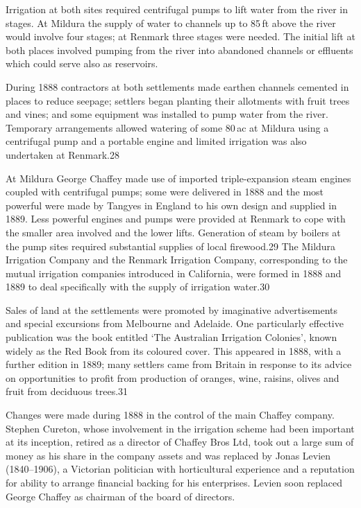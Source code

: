 Irrigation at both sites required centrifugal pumps to lift water from
the river in stages.  At Mildura the supply of water to channels up to
85\,ft above the river would involve four stages; at Renmark three
stages were needed. The initial lift at both places involved pumping
from the river into abandoned channels or effluents which could serve
also as reservoirs.

During 1888 contractors at both settlements made earthen channels
cemented in places to reduce seepage; settlers began planting their
allotments with fruit trees and vines; and some equipment was
installed to pump water from the river. Temporary arrangements allowed
watering of some 80\,ac at Mildura using a centrifugal pump and a
portable engine and limited irrigation was also undertaken at
Renmark.28

At Mildura George Chaffey made use of imported triple-expansion steam
engines coupled with centrifugal pumps; some were delivered in 1888
and the most powerful were made by Tangyes in England to his own
design and supplied in 1889.  Less powerful engines and pumps were
provided at Renmark to cope with the smaller area involved and the
lower lifts.  Generation of steam by boilers at the pump sites
required substantial supplies of local firewood.29 The Mildura
Irrigation Company and the Renmark Irrigation Company, corresponding
to the mutual irrigation companies introduced in California, were
formed in 1888 and 1889 to deal specifically with the supply of
irrigation water.30

Sales of land at the settlements were promoted by imaginative
advertisements and special excursions from Melbourne and Adelaide.
One particularly effective publication was the book entitled `The
Australian Irrigation Colonies', known widely as the Red Book from its
coloured cover.  This appeared in 1888, with a further edition in
1889; many settlers came from Britain in response to its advice on
opportunities to profit from production of oranges, wine, raisins,
olives and fruit from deciduous trees.31

Changes were made during 1888 in the control of the main Chaffey
company.  Stephen Cureton, whose involvement in the irrigation scheme
had been important at its inception, retired as a director of Chaffey
Bros Ltd, took out a large sum of money as his share in the company
assets and was replaced by Jonas Levien (1840--1906), a Victorian
politician with horticultural experience and a reputation for ability
to arrange financial backing for his enterprises.  Levien soon
replaced George Chaffey as chairman of the board of directors.

